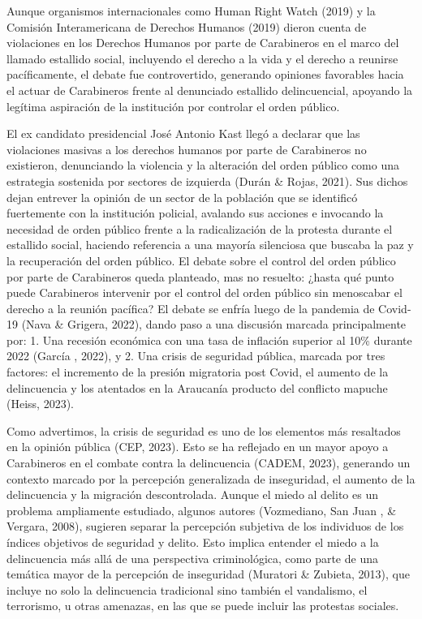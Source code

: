 \documentclass[12pt,twoside]{templates/facsothesis}
\begin{document}
Aunque organismos internacionales como Human Right Watch (2019) y la Comisión Interamericana de Derechos Humanos (2019) dieron cuenta de violaciones en los Derechos Humanos por parte de Carabineros en el marco del llamado estallido social, incluyendo el derecho a la vida y el derecho a reunirse pacíficamente, el debate fue controvertido, generando opiniones favorables hacia el actuar de Carabineros frente al denunciado estallido delincuencial, apoyando la legítima aspiración de la institución por controlar el orden público.

El ex candidato presidencial José Antonio Kast llegó a declarar que las violaciones masivas a los derechos humanos por parte de Carabineros no existieron, denunciando la violencia y la alteración del orden público como una estrategia sostenida por sectores de izquierda (Durán \& Rojas, 2021). Sus dichos dejan entrever la opinión de un sector de la población que se identificó fuertemente con la institución policial, avalando sus acciones e invocando la necesidad de orden público frente a la radicalización de la protesta durante el estallido social, haciendo referencia a una mayoría silenciosa que buscaba la paz y la recuperación del orden público.
El debate sobre el control del orden público por parte de Carabineros queda planteado, mas no resuelto: ¿hasta qué punto puede Carabineros intervenir por el control del orden público sin menoscabar el derecho a la reunión pacífica? El debate se enfría luego de la pandemia de Covid-19 (Nava \& Grigera, 2022), dando paso a una discusión marcada principalmente por: 1. Una recesión económica con una tasa de inflación superior al 10\% durante 2022 (García , 2022), y 2. Una crisis de seguridad pública, marcada por tres factores: el incremento de la presión migratoria post Covid, el aumento de la delincuencia y los atentados en la Araucanía producto del conflicto mapuche (Heiss, 2023).

Como advertimos, la crisis de seguridad es uno de los elementos más resaltados en la opinión pública (CEP, 2023). Esto se ha reflejado en un mayor apoyo a Carabineros en el combate contra la delincuencia (CADEM, 2023), generando un contexto marcado por la percepción generalizada de inseguridad, el aumento de la delincuencia y la migración descontrolada. Aunque el miedo al delito es un problema ampliamente estudiado, algunos autores (Vozmediano, San Juan , \& Vergara, 2008), sugieren separar la percepción subjetiva de los individuos de los índices objetivos de seguridad y delito. Esto implica entender el miedo a la delincuencia más allá de una perspectiva criminológica, como parte de una temática mayor de la percepción de inseguridad (Muratori \& Zubieta, 2013), que incluye no solo la delincuencia tradicional sino también el vandalismo, el terrorismo, u otras amenazas, en las que se puede incluir las protestas sociales.
\end{document}
